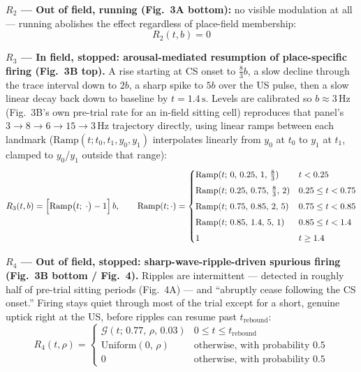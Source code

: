 \documentclass{article}
\begin{document}
\medskip\noindent
\textbf{$R_2$ --- Out of field, running (Fig.\ 3A bottom):} no visible modulation at
all --- running abolishes the effect regardless of place-field membership:
\begin{equation}
    R_2(t, b) = 0
\end{equation}

\medskip\noindent
\textbf{$R_3$ --- In field, stopped: arousal-mediated resumption of
place-specific firing (Fig.\ 3B top).} A rise starting at CS onset to $\tfrac{8}{3}b$,
a slow decline through the trace interval down to $2b$, a sharp spike to $5b$ over the
US pulse, then a slow linear decay back down to baseline by $t=1.4\,\text{s}$. Levels
are calibrated so $b \approx 3\,\text{Hz}$ (Fig.\ 3B's own pre-trial rate for an
in-field sitting cell) reproduces that panel's $3 \to 8 \to 6 \to 15 \to 3\,\text{Hz}$
trajectory directly, using linear ramps between each landmark
($\mathrm{Ramp}(t; t_0, t_1, y_0, y_1)$ interpolates linearly from $y_0$ at $t_0$ to
$y_1$ at $t_1$, clamped to $y_0$/$y_1$ outside that range):
\begin{equation}\label{eq:arousal-r3}
    R_3(t, b) = \Bigl[\mathrm{Ramp}\bigl(t;\; \cdot\bigr) - 1\Bigr] \, b, \qquad
    \mathrm{Ramp}(t; \cdot) = \begin{cases}
        \mathrm{Ramp}(t;\, 0,\, 0.25,\, 1,\, \tfrac{8}{3}) & t < 0.25 \\[4pt]
        \mathrm{Ramp}(t;\, 0.25,\, 0.75,\, \tfrac{8}{3},\, 2) & 0.25 \leq t < 0.75 \\[4pt]
        \mathrm{Ramp}(t;\, 0.75,\, 0.85,\, 2,\, 5) & 0.75 \leq t < 0.85 \\[4pt]
        \mathrm{Ramp}(t;\, 0.85,\, 1.4,\, 5,\, 1) & 0.85 \leq t < 1.4 \\[4pt]
        1 & t \geq 1.4
    \end{cases}
\end{equation}

\medskip\noindent
\textbf{$R_4$ --- Out of field, stopped: sharp-wave-ripple-driven spurious firing
(Fig.\ 3B bottom / Fig.\ 4).} Ripples are intermittent --- detected in roughly half of
pre-trial sitting periods (Fig.\ 4A) --- and ``abruptly cease following the CS onset.''
Firing stays quiet through most of the trial except for a short, genuine uptick right
at the US, before ripples can resume past $t_{\mathrm{rebound}}$:
\begin{equation}
    R_4(t, \rho) = \begin{cases}
        \mathcal{G}(t;\, 0.77,\, \rho,\, 0.03) & 0 \leq t \leq t_{\mathrm{rebound}} \\[4pt]
        \mathrm{Uniform}(0,\, \rho) & \text{otherwise, with probability } 0.5 \\[4pt]
        0                                          & \text{otherwise, with probability } 0.5
    \end{cases}
\end{equation}
\end{document}
